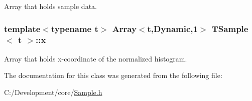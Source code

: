 Array that holds sample data. 

\hypertarget{class_t_sample_ab6b31fdfd8547fb15df70eac7f6b84e3}{
\subsubsection[{x}]{\setlength{\rightskip}{0pt plus 5cm}template$<$typename t$>$ Array$<$t,Dynamic,1$>$ {\bf T\-Sample}$<$ t $>$\-::x\hspace{0.3cm}{\ttfamily [protected]}}}\label{class_t_sample_ab6b31fdfd8547fb15df70eac7f6b84e3}


Array that holds x-\/coordinate of the normalized histogram. 



The documentation for this class was generated from the following file\-:\begin{DoxyCompactItemize}
\item 
C\-:/\-Development/core/\hyperlink{_sample_8h}{Sample.\-h}\end{DoxyCompactItemize}
